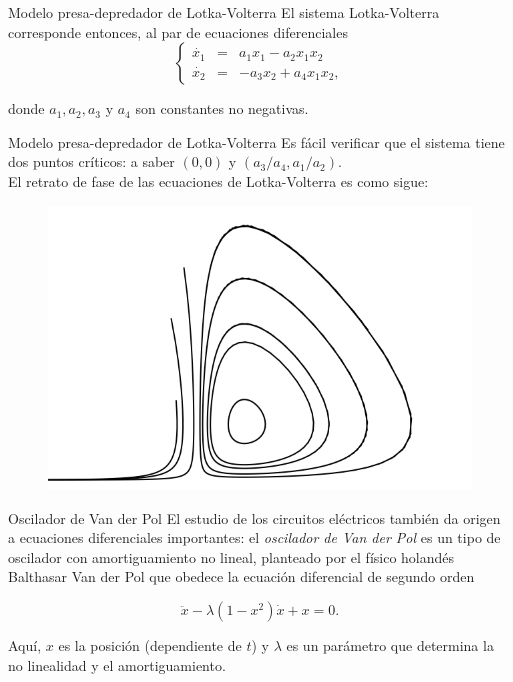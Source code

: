 \documentclass{beamer}
\begin{document}
\begin{frame}{Modelo presa-depredador de Lotka-Volterra}
El sistema Lotka-Volterra corresponde entonces, al par de ecuaciones diferenciales
$$
\left\{
	\begin{array}{lll}
		\dot{x_1} & = & a_1x_1 - a_2x_1x_2 \\
		\dot{x_2} & = & -a_3x_2 + a_4x_1x_2,
	\end{array} \right.
$$

donde $a_1, a_2, a_3$ y $a_4$ son constantes no negativas.
\end{frame}

\begin{frame}{Modelo presa-depredador de Lotka-Volterra}
Es fácil verificar que el sistema tiene dos puntos críticos: a saber $(0,0)$ y $(a_3 / a_4, a_1 / a_2)$.\\
\pause
El retrato de fase de las ecuaciones de Lotka-Volterra es como sigue:

\begin{figure}[!ht] \centering
	\includegraphics[scale=0.35]{../figures/lotkavolterra.png}
\end{figure}

\end{frame}

\begin{frame}{Oscilador de Van der Pol}
El estudio de los circuitos eléctricos también da origen a ecuaciones diferenciales importantes: el \emph{oscilador de Van der Pol} es un tipo de oscilador con amortiguamiento no lineal, planteado por el físico holandés Balthasar Van der Pol que obedece la ecuación diferencial de segundo orden

$$
	\ddot{x} - \lambda (1-x^2)\dot{x} + x = 0.
$$

Aquí, $x$ es la posición (dependiente de $t$) y $\lambda$ es un parámetro que determina la no linealidad y el amortiguamiento.
\end{frame}
\end{document}
